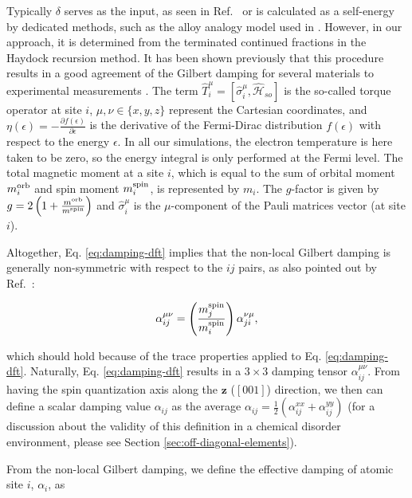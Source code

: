 Typically $\delta$ serves as the input, as seen in Ref.~\cite{PhysRevLett.99.027204} or is calculated as a self-energy by dedicated methods, such as the alloy analogy model used in \cite{PhysRevLett.107.066603}. However, in our approach, it is determined from the terminated continued fractions in the Haydock recursion method. It has been shown previously that this procedure results in a good agreement of the Gilbert damping for several materials to experimental measurements \cite{PhysRevB.108.014433}. The term $\hat{T}^{\mu}_i=\left[\hat{\sigma}^{\mu}_i,\hat{\mathcal{H}}_{so}\right]$ is the so-called torque operator \cite{PhysRevMaterials.2.013801} at site $i$,  $\mu,\nu\in\{x,y,z\}$ represent the Cartesian coordinates, and $\eta(\epsilon)=-\frac{\partial f(\epsilon)}{\partial\epsilon}$ is the derivative of the Fermi-Dirac distribution $f(\epsilon)$ with respect to the energy $\epsilon$. In all our simulations, the electron temperature is here taken to be zero, so the energy integral is only performed at the Fermi level. The total magnetic moment at a site $i$, which is equal to the sum of orbital moment $m^{\textnormal{orb}}_{i}$ and spin moment $m^{\textnormal{spin}}_{i}$,  is represented by $m_{i}$. The $g$-factor is given by $g=2\left(1+\frac{m^{\textnormal{orb}}}{m^{\textnormal{spin}}}\right)$ and $\hat{\sigma}^{\mu}_i$ is the $\mu$-component of the Pauli matrices vector (at site $i$).

  Altogether, Eq. \ref{eq:damping-dft} implies that the non-local Gilbert damping is generally non-symmetric with respect to the $ij$ pairs, as also pointed out by Ref.~\cite{PhysRevB.109.094417}: 

\begin{equation}
\label{eq:symmetry-alphaij}
\alpha_{ij}^{\mu\nu} = \left(\frac{m_j^{\textnormal{spin}}}{m_i^{\textnormal{spin}}}\right)\alpha_{ji}^{\nu\mu},
\end{equation}

\noindent which should hold because of the trace properties applied to Eq. \ref{eq:damping-dft}. Naturally, Eq. \ref{eq:damping-dft} results in a $3\times3$ damping tensor $\alpha_{ij}^{\mu\nu}$. From having the spin quantization axis along the $\mathbf{z}$ ($[001]$) direction, we then can define a scalar damping value $\alpha_{ij}$ as the average $\alpha_{ij}=\frac{1}{2}(\alpha_{ij}^{xx}+\alpha_{ij}^{yy})$ (for a discussion about the validity of this definition in a chemical disorder environment, please see Section \ref{sec:off-diagonal-elements}). 

From the non-local Gilbert damping, we define the effective damping of atomic site $i$, $\alpha_i$, as


